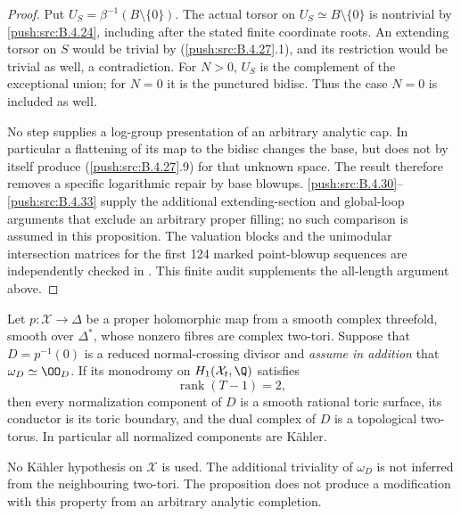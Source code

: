 \begin{proof}
Put $U_S=\beta^{-1}(B\setminus\{0\})$.
The actual torsor on $U_S\simeq B\setminus\{0\}$
is nontrivial by \ref{push:src:B.4.24}, including after the
stated finite coordinate roots. An extending
torsor on $S$ would be trivial by (\ref{push:src:B.4.27}.1),
and its restriction would be trivial as well,
a contradiction. For $N>0$, $U_S$ is the
complement of the exceptional union; for
$N=0$ it is the punctured bidisc. Thus the
case $N=0$ is included as well.

No step supplies a log-group presentation of
an arbitrary analytic cap. In particular a
flattening of its map to the bidisc changes
the base, but does not by itself produce
(\ref{push:src:B.4.27}.9) for that unknown space. The result
therefore removes a specific logarithmic
repair by base blowups. \ref{push:src:B.4.30}--\ref{push:src:B.4.33} supply the
additional extending-section and global-loop arguments
that exclude an arbitrary proper filling; no such
comparison is assumed in this proposition.
The valuation blocks and the unimodular
intersection matrices for the first 124 marked
point-blowup sequences are independently checked
in . This finite
audit supplements the all-length argument above.
\end{proof}

\begin{proposition}\label{push:src:B.4.28}
Let $p:\mathcal X\to\Delta$ be a proper holomorphic map
from a smooth complex threefold, smooth over $\Delta^*$,
whose nonzero fibres are complex two-tori. Suppose that
$D=p^{-1}(0)$ is a reduced normal-crossing divisor and
\emph{assume in addition} that $\omega_D\simeq\OO_D$.
If its monodromy on $H_1(\mathcal X_t,\Q)$ satisfies
\[
 \operatorname{rank}(T-1)=2,                         \tag{B.4.28.1}
\]
then every normalization component of $D$ is a smooth
rational toric surface, its conductor is its toric
boundary, and the dual complex of $D$ is a topological
two-torus. In particular all normalized components are
K\"ahler.

No K\"ahler hypothesis on $\mathcal X$ is used. The
additional triviality of $\omega_D$ is not inferred from
the neighbouring two-tori. The proposition does not
produce a modification with this property from an
arbitrary analytic completion.
\end{proposition}

